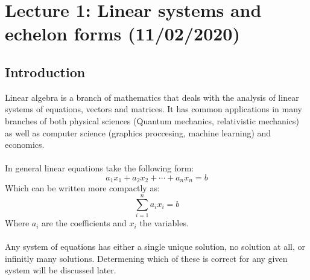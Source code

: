 \documentclass[11pt, a4paper]{article}
\begin{document}
\section{Lecture 1: Linear systems and echelon forms (11/02/2020)}
\subsection{Introduction}
Linear algebra is a branch of mathematics that deals with the analysis of linear systems
of equations, vectors and matrices. It has common applications in many branches of both physical sciences (Quantum mechanics, relativistic mechanics) as well
as computer science (graphics proccesing, machine learning) and economics.\\
\\
In general linear equations take the following form:
\begin{equation}
    a_1x_1 + a_2x_2 + \cdots + a_nx_n = b
\end{equation}
Which can be written more compactly as:
\begin{equation}
    \sum_{i=1}^{n} a_ix_i = b
\end{equation}
Where $a_i$ are the coefficients and $x_i$ the variables.\\
\\
Any system of equations has either a single unique solution, no solution at all, 
or infinitly many solutions. Determening which of these is correct for any given system will be discussed later.
\end{document}
